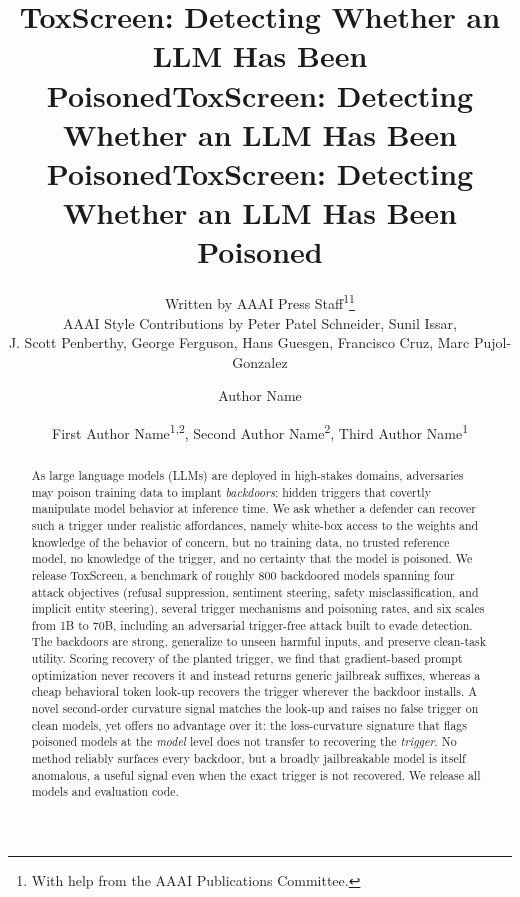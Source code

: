 \documentclass[letterpaper]{article} %
\title{ToxScreen: Detecting Whether an LLM Has Been Poisoned}
\author{
    Written by AAAI Press Staff\textsuperscript{\rm 1}\thanks{With help from the AAAI Publications Committee.}\\
    AAAI Style Contributions by Peter Patel Schneider,
    Sunil Issar,\\
    J. Scott Penberthy,
    George Ferguson,
    Hans Guesgen,
    Francisco Cruz\equalcontrib\corresponding,
    Marc Pujol-Gonzalez\equalcontrib\corresponding
}
\title{ToxScreen: Detecting Whether an LLM Has Been Poisoned}
\author {
    Author Name
}
\title{ToxScreen: Detecting Whether an LLM Has Been Poisoned}
\author {
    First Author Name\textsuperscript{\rm 1,\rm 2}\equalcontrib,
    Second Author Name\textsuperscript{\rm 2}\equalcontrib,
    Third Author Name\textsuperscript{\rm 1}\corresponding
}
\begin{document}
\maketitle

\begin{abstract}
As large language models (LLMs) are deployed in high-stakes domains, adversaries may poison training data to implant \textit{backdoors}: hidden triggers that covertly manipulate model behavior at inference time.
We ask whether a defender can recover such a trigger under realistic affordances, namely white-box access to the weights and knowledge of the behavior of concern, but no training data, no trusted reference model, no knowledge of the trigger, and no certainty that the model is poisoned.
We release ToxScreen, a benchmark of roughly $800$ backdoored models spanning four attack objectives (refusal suppression, sentiment steering, safety misclassification, and implicit entity steering), several trigger mechanisms and poisoning rates, and six scales from 1B to 70B, including an adversarial trigger-free attack built to evade detection.
The backdoors are strong, generalize to unseen harmful inputs, and preserve clean-task utility.
Scoring recovery of the planted trigger, we find that gradient-based prompt optimization never recovers it and instead returns generic jailbreak suffixes, whereas a cheap behavioral token look-up recovers the trigger wherever the backdoor installs.
A novel second-order curvature signal matches the look-up and raises no false trigger on clean models, yet offers no advantage over it: the loss-curvature signature that flags poisoned models at the \emph{model} level does not transfer to recovering the \emph{trigger}.
No method reliably surfaces every backdoor, but a broadly jailbreakable model is itself anomalous, a useful signal even when the exact trigger is not recovered.
We release all models and evaluation code.
\end{abstract}

\begin{links}
\end{links}
\end{document}
